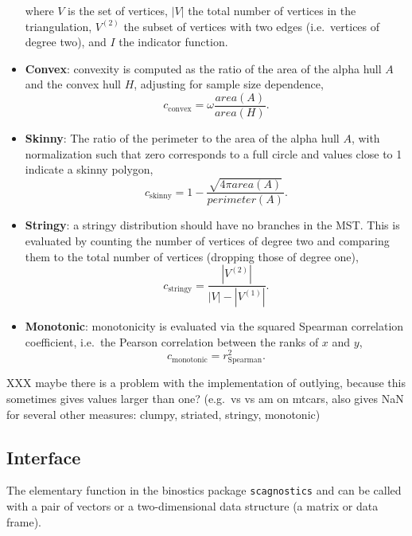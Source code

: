 \begin{itemize}
\begin{equation}
  \end{equation} where \(V\) is the set of vertices, \(|V|\) the total
  number of vertices in the triangulation, \(V^{(2)}\) the subset of
  vertices with two edges (i.e.~vertices of degree two), and \(I\) the
  indicator function.
\item
  \textbf{Convex}: convexity is computed as the ratio of the area of the
  alpha hull \(A\) and the convex hull \(H\), adjusting for sample size
  dependence, \begin{equation}
  c_{\mathrm{convex}} = \omega \frac{area(A)}{area(H)}.
  \end{equation}
\item
  \textbf{Skinny}: The ratio of the perimeter to the area of the alpha
  hull \(A\), with normalization such that zero corresponds to a full
  circle and values close to 1 indicate a skinny polygon,
  \begin{equation}
  c_{\mathrm{skinny}} = 1 -  \frac{\sqrt{4\pi area(A)}}{perimeter(A)}.
  \end{equation}
\item
  \textbf{Stringy}: a stringy distribution should have no branches in
  the MST. This is evaluated by counting the number of vertices of
  degree two and comparing them to the total number of vertices
  (dropping those of degree one), \begin{equation}
  c_{\mathrm{stringy}} = \frac{|V^{(2)}|}{|V| - |V^{(1)}|}.
  \end{equation}
\item
  \textbf{Monotonic}: monotonicity is evaluated via the squared Spearman
  correlation coefficient, i.e.~the Pearson correlation between the
  ranks of \(x\) and \(y\), \begin{equation}
  c_{\mathrm{monotonic}} = r_{\mathrm{Spearman}}^2.
  \end{equation}
\end{itemize}

XXX maybe there is a problem with the implementation of outlying,
because this sometimes gives values larger than one? (e.g.~vs vs am on
mtcars, also gives NaN for several other measures: clumpy, striated,
stringy, monotonic)

\hypertarget{interface}{%
\subsection{Interface}\label{interface}}

The elementary function in the binostics package \texttt{scagnostics}
and can be called with a pair of vectors or a two-dimensional data
structure (a matrix or data frame).

